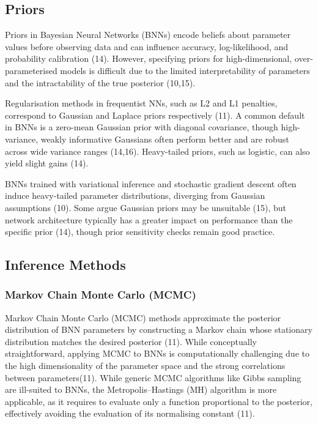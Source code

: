 \documentclass[
  a4paper,
]{scrreprt}
\begin{document}
\subsection{Priors}\label{priors}

Priors in Bayesian Neural Networks (BNNs) encode beliefs about parameter
values before observing data and can influence accuracy, log-likelihood,
and probability calibration (14). However, specifying priors for
high-dimensional, over-parameterised models is difficult due to the
limited interpretability of parameters and the intractability of the
true posterior (10,15).

Regularisation methods in frequentist NNs, such as L2 and L1 penalties,
correspond to Gaussian and Laplace priors respectively (11). A common
default in BNNs is a zero-mean Gaussian prior with diagonal covariance,
though high-variance, weakly informative Gaussians often perform better
and are robust across wide variance ranges (14,16). Heavy-tailed priors,
such as logistic, can also yield slight gains (14).

BNNs trained with variational inference and stochastic gradient descent
often induce heavy-tailed parameter distributions, diverging from
Gaussian assumptions (10). Some argue Gaussian priors may be unsuitable
(15), but network architecture typically has a greater impact on
performance than the specific prior (14), though prior sensitivity
checks remain good practice.

\subsection{Inference Methods}\label{inference-methods}

\subsubsection{Markov Chain Monte Carlo
(MCMC)}\label{markov-chain-monte-carlo-mcmc}

Markov Chain Monte Carlo (MCMC) methods approximate the posterior
distribution of BNN parameters by constructing a Markov chain whose
stationary distribution matches the desired posterior (11). While
conceptually straightforward, applying MCMC to BNNs is computationally
challenging due to the high dimensionality of the parameter space and
the strong correlations between parameters(11). While generic MCMC
algorithms like Gibbs sampling are ill-suited to BNNs, the
Metropolis--Hastings (MH) algorithm is more applicable, as it requires
to evaluate only a function proportional to the posterior, effectively
avoiding the evaluation of its normalising constant (11).
\end{document}
